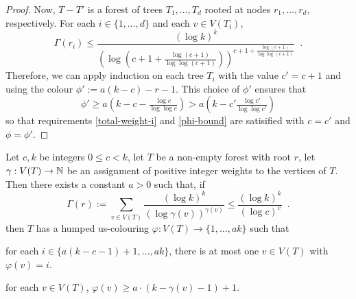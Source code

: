 \documentclass[kpfonts]{patmorin}
\begin{document}
\begin{proof}
   Now, $T-T'$ is a forest of trees $T_1,\ldots,T_d$ rooted at nodes $r_1,\ldots,r_d$, respectively.  For each $i\in\{1,\ldots,d\}$ and each $v\in V(T_i)$,
   \[
       \Gamma(r_i) \le \frac{(\log k)^k}{\left(\log\left(c+1+\tfrac{\log (c+1)}{\log\log (c+1)}\right)\right)^{c+1+\tfrac{\log (c+1)}{\log\log(c+1)}}} \enspace .
   \]
   Therefore, we can apply induction on each tree $T_i$ with the value $c'=c+1$ and using the colour
   $\phi':=a(k-c)-r-1$.  This choice of $\phi'$ ensures that
   \[
       \phi' \ge a\left(k-c-\tfrac{\log c}{\log\log c}\right) >  a\left(k-c'\tfrac{\log c'}{\log\log c'}\right)
   \]
   so that requirements \cref{total-weight-i} and \cref{phi-bound} are satisified with $c=c'$ and $\phi=\phi'$.
\end{proof}

\begin{lem}\label{tree-ii}
Let $c,k$ be integers $0\le c< k$, let $T$ be a non-empty forest with root $r$, let $\gamma:V(T)\to\mathbb{N}$ be an assignment of positive integer weights to the vertices of $T$.  Then there exists a constant $a>0$ such that,
if
\begin{equation}
   \Gamma(r):=\sum_{v\in V(T)} \frac{(\log k)^k}{(\log \gamma(v))^{\gamma(v)}} \le \frac{(\log k)^k}{(\log c)^c} \enspace . \label{total-weight-ii}
\end{equation}
then  $T$ has a humped us-colouring $\varphi:V(T)\to\{1,\ldots,ak\}$ such that
\begin{compactenum}[(P1)]
    \item for each $i\in\{a(k-c-1)+1,\ldots,ak\}$, there is at most one $v\in V(T)$ with $\varphi(v)=i$.
    \item for each $v\in V(T)$, $\varphi(v)\ge a\cdot(k-\gamma(v)-1)+1$.
\end{compactenum}
\end{lem}
\end{document}
